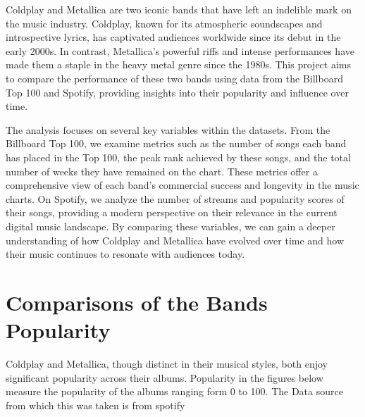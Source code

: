 \documentclass[12pt,preprint, authoryear]{elsarticle}
\numberwithin{equation}{section}
\numberwithin{figure}{section}
\numberwithin{table}{section}
\begin{document}
Coldplay and Metallica are two iconic bands that have left an indelible
mark on the music industry. Coldplay, known for its atmospheric
soundscapes and introspective lyrics, has captivated audiences worldwide
since its debut in the early 2000s. In contrast, Metallica's powerful
riffs and intense performances have made them a staple in the heavy
metal genre since the 1980s. This project aims to compare the
performance of these two bands using data from the Billboard Top 100 and
Spotify, providing insights into their popularity and influence over
time.

The analysis focuses on several key variables within the datasets. From
the Billboard Top 100, we examine metrics such as the number of songs
each band has placed in the Top 100, the peak rank achieved by these
songs, and the total number of weeks they have remained on the chart.
These metrics offer a comprehensive view of each band's commercial
success and longevity in the music charts. On Spotify, we analyze the
number of streams and popularity scores of their songs, providing a
modern perspective on their relevance in the current digital music
landscape. By comparing these variables, we can gain a deeper
understanding of how Coldplay and Metallica have evolved over time and
how their music continues to resonate with audiences today.

\hypertarget{comparisons-of-the-bands-popularity}{%
\section{\texorpdfstring{Comparisons of the Bands
Popularity\label{Comparisons of the Bands Popularity}}{Comparisons of the Bands Popularity}}\label{comparisons-of-the-bands-popularity}}

Coldplay and Metallica, though distinct in their musical styles, both
enjoy significant popularity across their albums. Popularity in the
figures below measure the popularity of the albums ranging form 0 to
100. The Data source from which this was taken is from spotify
\end{document}
